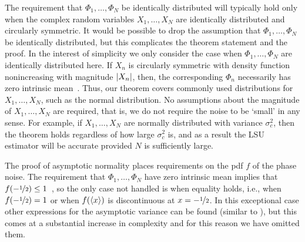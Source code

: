 \documentclass[journal]{IEEEtran}
\begin{document}
The requirement that $\Phi_1, \dots, \Phi_N$ be identically distributed will typically hold only when the complex random variables $X_1, \dots, X_N$ are identically distributed and circularly symmetric.  It would be possible to drop the assumption that $\Phi_1, \dots, \Phi_N$ be identically distributed, but this complicates the theorem statement and the proof.  In the interest of simplicity we only consider the case when $\Phi_1, \dots, \Phi_N$ are identically distributed here.  If $X_n$ is circularly symmetric with density function nonincreasing with magnitude $\left\vert X_n \right\vert$, then, the corresponding $\Phi_n$ necessarily has zero intrinsic mean~\cite[Theorem 5.2]{McKilliam2010thesis}.  Thus, our theorem covers commonly used distributions for $X_1, \dots, X_N$, such as the normal distribution.  No assumptions about the magnitude of $X_1, \dots, X_N$ are required, that is, we do not require the noise to be `small' in any sense.  For example, if $X_1, \dots, X_N$ are normally distributed with variance $\sigma_c^2$, then the theorem holds regardless of how large $\sigma_c^2$ is, and as a result the LSU estimator will be accurate provided $N$ is sufficiently large.

The proof of asymptotic normality places requirements on the pdf $f$ of the phase noise.  The requirement that $\Phi_1, \dots, \Phi_N$ have zero intrinsic mean implies that $f(-\nicefrac{1}{2}) \leq 1$~\cite[Lemma~1]{McKilliam_mean_dir_est_sq_arc_length2010}, so the only case not handled is when equality holds, i.e., when $f(-\nicefrac{1}{2}) = 1$ or when $f(\left\langle x \right\rangle)$ is discontinuous at $x = -\nicefrac{1}{2}$. In this exceptional case other expressions for the asymptotic variance can be found (similar to \cite[Theorem 3.1]{Hotz_circle_means_2011}), but this comes at a substantial increase in complexity and for this reason we have omitted them. %

\end{document}
